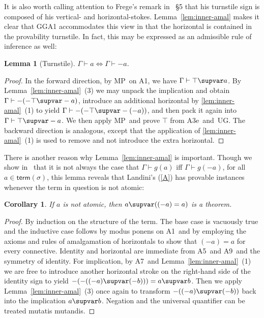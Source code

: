\documentclass{preprint}
\newtheorem{lemma}[theorem]{Lemma}
\newtheorem{corollary}[theorem]{Corollary}
\newcommand{\term}{\mathsf{term}}
\newcommand{\GGA}{\textsf{GGA1}}
\newcommand{\ia}{A1}%
\newcommand{\iiie}{A3e}%
\newcommand{\ahor}{A5}%
\newcommand{\aimp}{A7}%
\newcommand{\aid}{A9}%
\renewcommand{\mp}{MP}%
\newcommand{\ug}{UG}%
\renewcommand{\to}{\supvar}
\begin{document}
It is also worth calling attention to Frege's remark in \gga~\S5 that his turnstile sign is composed of his vertical- and horizontal-stokes. Lemma~\ref{lem:inner-amal} makes it clear that {\GGA} accommodates this view in that the horizontal is contained in the provability turnstile. In fact, this may be expressed as an admissible rule of inference as well: 

\begin{lemma}[Turnstile] \label{lem:turnstile}
	$\Gamma \vdash a \Longleftrightarrow \Gamma \vdash -a$.
\end{lemma}
\begin{proof}
	In the forward direction, by \mp~on \ia, we have $\Gamma \vdash \top \to a$. 
	By Lemma~\ref{lem:inner-amal}~(3) we may unpack the implication and obtain $\Gamma \vdash -(-\top \to -a)$, introduce an additional horizontal by \ref{lem:inner-amal}~(1) to yield $\Gamma \vdash -(-\top \to -(-a))$, and then pack it again into $\Gamma \vdash \top \to -a$. We then apply \mp~and prove $\top$ from \iiie~and~\ug. 
	The backward direction is analogous, except that the application of \ref{lem:inner-amal}~(1) is used to remove and not introduce the extra horizontal. 
\end{proof}

There is another reason why Lemma~\ref{lem:inner-amal} is important. 
Though we show in~ that it is not always the case that $\Gamma \vdash g(a)$ iff $\Gamma \vdash g(-a)$, for all $a \in \term(\sigma)$, 
this lemma reveals that Landini's (\ref{A}) has provable instances whenever the term in question is not atomic:

\begin{corollary} \label{lem:a-cor} 
	If $a$ is not atomic, then $ a \to ((- a) = a)$ is a theorem.
\end{corollary}
\begin{proof}
	By induction on the structure of the term. The base case is vacuously true and the inductive case follows by modus ponens on \ia~and by employing the axioms and rules of amalgamation of horizontals to show that $(- a) = a$ for every connective. 
	Identity and horizontal are immediate from \ahor~and \aid~and the symmetry of identity. 
	For implication, 
	by \aimp~and Lemma~\ref{lem:inner-amal}~(1) we are free to introduce another horizontal stroke on the right-hand side of the identity sign to yield $- (- ((-a) \to (- b))) = a \to b$. Then we apply Lemma~\ref{lem:inner-amal}~(3) once again to transform $- ((-a) \to (- b))$ back into the implication $a \to b$. Negation and the universal quantifier can be treated mutatis mutandis. 
\end{proof}
\end{document}
